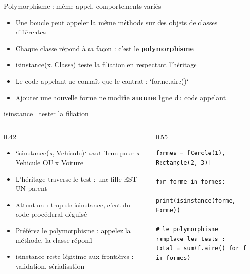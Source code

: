 \documentclass[aspectratio=169,11pt]{beamer}
\begin{document}
\begin{frame}{Polymorphisme : même appel, comportements variés}
\begin{itemize}
  \item Une boucle peut appeler la même méthode sur des objets de classes différentes
  \item Chaque classe répond à sa façon : c'est le \textbf{polymorphisme}
  \item isinstance(x, Classe) teste la filiation en respectant l'héritage
  \item Le code appelant ne connaît que le contrat : `forme.aire()`
  \item Ajouter une nouvelle forme ne modifie \textbf{aucune} ligne du code appelant
\end{itemize}
\end{frame}

\begin{frame}[fragile]{isinstance : tester la filiation}
\begin{columns}[t]
\begin{column}{0.42\textwidth}
\begin{itemize}
  \setlength{\itemsep}{1.5pt}\setlength{\parskip}{0pt}
  \item `isinstance(x, Vehicule)` vaut True pour x Vehicule OU x Voiture
  \item L'héritage traverse le test : une fille EST UN parent
  \item Attention : trop de isinstance, c'est du code procédural déguisé
  \item Préférez le polymorphisme : appelez la méthode, la classe répond
  \item isinstance reste légitime aux frontières : validation, sérialisation
\end{itemize}
\end{column}
\hspace{0.02\textwidth}
\begin{column}{0.55\textwidth}
\begin{lstlisting}[style=pysmall]
formes = [Cercle(1), Rectangle(2, 3)]

for forme in formes:
    print(isinstance(forme, Forme))

# le polymorphisme remplace les tests :
total = sum(f.aire() for f in formes)
\end{lstlisting}
\end{column}
\end{columns}
\end{frame}
\end{document}
